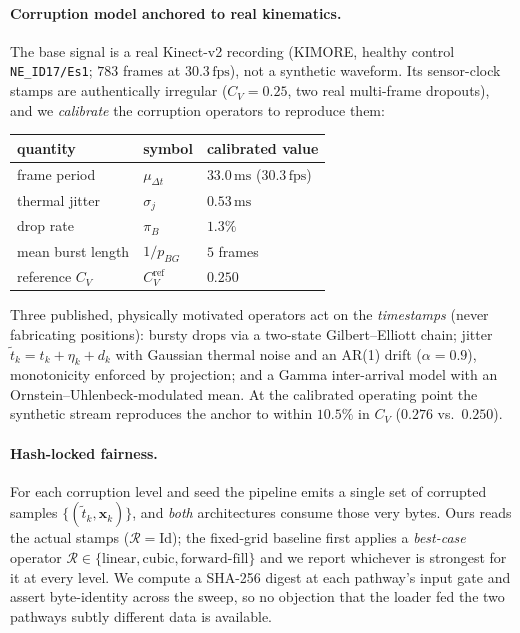 \documentclass[10pt,journal]{IEEEtran}
\begin{document}
\paragraph{Corruption model anchored to real kinematics.}
The base signal is a real Kinect-v2 recording (KIMORE, healthy control \texttt{NE\_ID17/Es1}; $783$
frames at $30.3\,\mathrm{fps}$), not a synthetic waveform. Its sensor-clock stamps are authentically
irregular ($C_V=0.25$, two real multi-frame dropouts), and we \emph{calibrate} the corruption
operators to reproduce them:
%
\begin{center}\small
\begin{tabular}{lll}
\hline
quantity & symbol & calibrated value \\ \hline
frame period      & $\mu_{\Delta t}$ & $33.0\,\mathrm{ms}$ ($30.3\,\mathrm{fps}$)\\
thermal jitter    & $\sigma_j$       & $0.53\,\mathrm{ms}$ \\
drop rate         & $\pi_B$          & $1.3\%$ \\
mean burst length & $1/p_{BG}$       & $5$ frames \\
reference $C_V$   & $C_V^{\mathrm{ref}}$ & $0.250$ \\ \hline
\end{tabular}
\end{center}
%
Three published, physically motivated operators act on the \emph{timestamps} (never fabricating
positions): bursty drops via a two-state Gilbert--Elliott chain; jitter
$\tilde t_k=t_k+\eta_k+d_k$ with Gaussian thermal noise and an AR(1) drift ($\alpha=0.9$),
monotonicity enforced by projection; and a Gamma inter-arrival model with an
Ornstein--Uhlenbeck-modulated mean. At the calibrated operating point the synthetic stream reproduces
the anchor to within $10.5\%$ in $C_V$ ($0.276$ vs.\ $0.250$).

\paragraph{Hash-locked fairness.}
For each corruption level and seed the pipeline emits a single set of corrupted samples
$\{(\tilde t_k,\bm{x}_k)\}$, and \emph{both} architectures consume those very bytes. Ours reads the
actual stamps ($\mathcal{R}=\mathrm{Id}$); the fixed-grid baseline first applies a \emph{best-case}
operator $\mathcal{R}\in\{\text{linear},\text{cubic},\text{forward-fill}\}$ and we report whichever is
strongest for it at every level. We compute a SHA-256 digest at each pathway's input gate and assert
byte-identity across the sweep, so no objection that the loader fed the two pathways subtly different
data is available.
\end{document}
